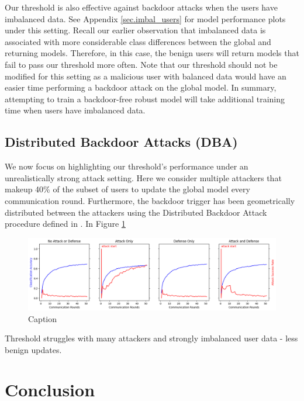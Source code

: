 \documentclass{article} %
\begin{document}
Our threshold is also effective against backdoor attacks when the users have imbalanced data. See Appendix \ref{sec.imbal_users} for model performance plots under this setting. Recall our earlier observation that imbalanced data is associated with more considerable class differences between the global and returning models. Therefore, in this case, the benign users will return models that fail to pass our threshold more often. Note that our threshold should not be modified for this setting as a malicious user with balanced data would have an easier time performing a backdoor attack on the global model. In summary, attempting to train a backdoor-free robust model will take additional training time when users have imbalanced data.

\subsection{Distributed Backdoor Attacks (DBA)}

We now focus on highlighting our threshold's performance under an unrealistically strong attack setting. Here we consider multiple attackers that makeup 40\% of the subset of users to update the global model every communication round. Furthermore, the backdoor trigger has been geometrically distributed between the attackers using the Distributed Backdoor Attack procedure defined in \cite{dba}. In Figure \ref{fig:distributed--alpha10000--alpha_val10000--accuracy}

\begin{figure}[H]
    \centering
    \includegraphics[width=\textwidth]{01_trusted/distributed/alpha10000--alpha_val10000/visuals/accuracy--n_malicious4--m_start1.png}
    \caption{Caption}
    \label{fig:distributed--alpha10000--alpha_val10000--accuracy}
\end{figure}

Threshold struggles with many attackers and strongly imbalanced user data - less benign updates.

% 
\section{Conclusion}
\end{document}
